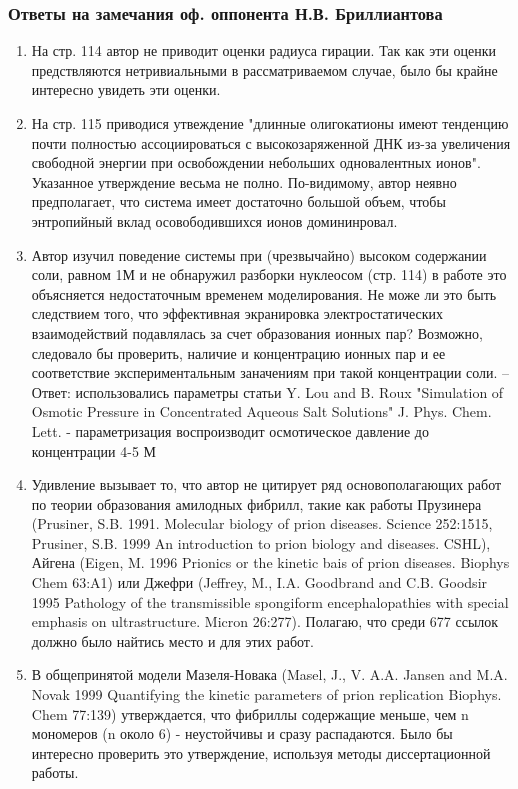 \begin{frame}[allowframebreaks]
    \frametitle{Ответы на замечания оф. оппонента Н.В. Бриллиантова}
    \begin{enumerate}
        \item На стр. 114 автор не приводит оценки радиуса гирации. Так как эти оценки предствляются нетривиальными в рассматриваемом случае, было бы крайне интересно увидеть эти оценки.
        \item На стр. 115 приводися утвеждение "длинные олигокатионы имеют тенденцию почти полностью ассоциироваться с высокозаряженной ДНК из-за увеличения свободной энергии при освобождении небольших одновалентных ионов". Указанное утверждение весьма не полно. По-видимому, автор неявно предполагает, что система имеет достаточно большой объем, чтобы энтропийный вклад осовободившихся ионов домининровал.
        \item Автор изучил поведение системы при (чрезвычайно) высоком содержании соли, равном 1М и не обнаружил разборки нуклеосом (стр. 114) в работе это объясняется недостаточным временем моделирования. Не може ли это быть следствием того, что эффективная экранировка электростатических взаимодействий подавлялась за счет образования ионных пар? Возможно, следовало бы проверить, наличие и концентрацию ионных пар и ее соответствие экспериментальным заначениям при такой концентрации соли. -- Ответ: использовались параметры статьи Y. Lou and B. Roux "Simulation of Osmotic Pressure in Concentrated Aqueous Salt Solutions" J. Phys. Chem. Lett. - параметризация воспроизводит осмотическое давление до концентрации 4-5 М
        \item Удивление вызывает то, что автор не цитирует ряд основополагающих работ по теории образования амилодных фибрилл, такие как работы Прузинера (Prusiner, S.B. 1991. Molecular biology of prion diseases. Science 252:1515, Prusiner, S.B. 1999 An introduction to prion biology and diseases. CSHL), Айгена (Eigen, M. 1996 Prionics or the kinetic bais of prion diseases. Biophys Chem 63:A1) или Джефри (Jeffrey, M., I.A. Goodbrand and C.B. Goodsir 1995 Pathology of the transmissible spongiform encephalopathies with special emphasis on ultrastructure. Micron 26:277). Полагаю, что среди 677 ссылок должно было найтись место и для этих работ.
        \item В общепринятой модели Мазеля-Новака (Masel, J., V. A.A. Jansen and M.A. Novak 1999 Quantifying the kinetic parameters of prion replication Biophys. Chem 77:139) утверждается, что фибриллы содержащие меньше, чем n мономеров (n около 6) - неустойчивы и сразу распадаются. Было бы интересно проверить это утверждение, используя методы диссертационной работы.

\end{enumerate}
\end{frame}
